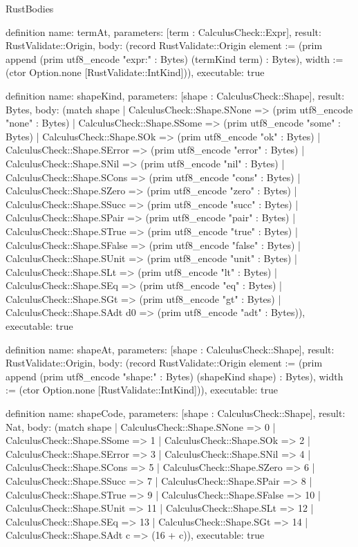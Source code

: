 \begin{lexlean}{RustBodies}
\begin{semanticmodule}
definition{
  name: termAt,
  parameters: [term : CalculusCheck::Expr],
  result: RustValidate::Origin,
  body: (record RustValidate::Origin {element := (prim append (prim utf8_encode "expr:" : Bytes) (termKind term) : Bytes), width := (ctor Option.none [RustValidate::IntKind])}),
  executable: true
}

definition{
  name: shapeKind,
  parameters: [shape : CalculusCheck::Shape],
  result: Bytes,
  body: (match shape
    | CalculusCheck::Shape.SNone => (prim utf8_encode "none" : Bytes)
    | CalculusCheck::Shape.SSome => (prim utf8_encode "some" : Bytes)
    | CalculusCheck::Shape.SOk => (prim utf8_encode "ok" : Bytes)
    | CalculusCheck::Shape.SError => (prim utf8_encode "error" : Bytes)
    | CalculusCheck::Shape.SNil => (prim utf8_encode "nil" : Bytes)
    | CalculusCheck::Shape.SCons => (prim utf8_encode "cons" : Bytes)
    | CalculusCheck::Shape.SZero => (prim utf8_encode "zero" : Bytes)
    | CalculusCheck::Shape.SSucc => (prim utf8_encode "succ" : Bytes)
    | CalculusCheck::Shape.SPair => (prim utf8_encode "pair" : Bytes)
    | CalculusCheck::Shape.STrue => (prim utf8_encode "true" : Bytes)
    | CalculusCheck::Shape.SFalse => (prim utf8_encode "false" : Bytes)
    | CalculusCheck::Shape.SUnit => (prim utf8_encode "unit" : Bytes)
    | CalculusCheck::Shape.SLt => (prim utf8_encode "lt" : Bytes)
    | CalculusCheck::Shape.SEq => (prim utf8_encode "eq" : Bytes)
    | CalculusCheck::Shape.SGt => (prim utf8_encode "gt" : Bytes)
    | CalculusCheck::Shape.SAdt d0 => (prim utf8_encode "adt" : Bytes)),
  executable: true
}

definition{
  name: shapeAt,
  parameters: [shape : CalculusCheck::Shape],
  result: RustValidate::Origin,
  body: (record RustValidate::Origin {element := (prim append (prim utf8_encode "shape:" : Bytes) (shapeKind shape) : Bytes), width := (ctor Option.none [RustValidate::IntKind])}),
  executable: true
}

definition{
  name: shapeCode,
  parameters: [shape : CalculusCheck::Shape],
  result: Nat,
  body: (match shape
    | CalculusCheck::Shape.SNone => 0
    | CalculusCheck::Shape.SSome => 1
    | CalculusCheck::Shape.SOk => 2
    | CalculusCheck::Shape.SError => 3
    | CalculusCheck::Shape.SNil => 4
    | CalculusCheck::Shape.SCons => 5
    | CalculusCheck::Shape.SZero => 6
    | CalculusCheck::Shape.SSucc => 7
    | CalculusCheck::Shape.SPair => 8
    | CalculusCheck::Shape.STrue => 9
    | CalculusCheck::Shape.SFalse => 10
    | CalculusCheck::Shape.SUnit => 11
    | CalculusCheck::Shape.SLt => 12
    | CalculusCheck::Shape.SEq => 13
    | CalculusCheck::Shape.SGt => 14
    | CalculusCheck::Shape.SAdt c => (16 + c)),
  executable: true
}


\end{semanticmodule}
\end{lexlean}
